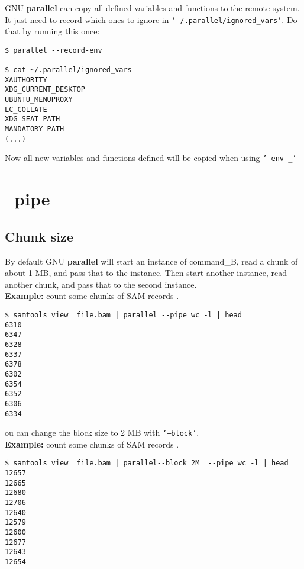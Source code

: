 \documentclass{article}
\newcommand{\example}[1]{
\textbf{Example: } {\color[rgb]{0,0,1} #1 } .
}
\newcommand{\cmdoption}[1]{\texttt{'#1'}}
\def\prl{\textbf{parallel}}
\begin{document}
GNU \prl{} can copy all defined variables and functions to the remote system. It just need to record which ones to ignore in \cmdoption{~/.parallel/ignored\_vars}. Do that by running this once:
\begin{lstlisting}
$ parallel --record-env

$ cat ~/.parallel/ignored_vars 
XAUTHORITY
XDG_CURRENT_DESKTOP
UBUNTU_MENUPROXY
LC_COLLATE
XDG_SEAT_PATH
MANDATORY_PATH
(...)
\end{lstlisting}
Now all new variables and functions defined will be copied when using  \cmdoption{--env \_}

%

\section{--pipe}
\subsection{Chunk size}
By default GNU \prl{} will start an instance of command\_B, read a chunk of about 1 MB, and pass that to the instance. Then start another instance, read another chunk, and pass that to the second instance.\\
\example{count some chunks of SAM records}
\begin{lstlisting}
$ samtools view  file.bam | parallel --pipe wc -l | head
6310
6347
6328
6337
6378
6302
6354
6352
6306
6334
\end{lstlisting}
ou can change the block size to 2 MB with  \cmdoption{--block}.\\
\example{count some chunks of SAM records}
\begin{lstlisting}
$ samtools view  file.bam | parallel--block 2M  --pipe wc -l | head
12657
12665
12680
12706
12640
12579
12600
12677
12643
12654
\end{lstlisting}
\end{document}
